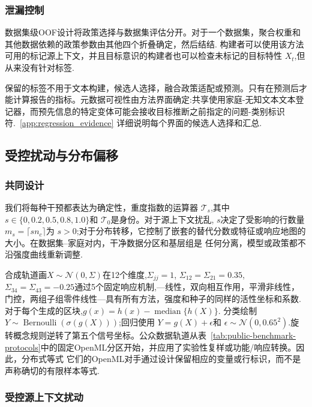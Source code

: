 \subsubsection{泄漏控制}
\label{app:leakage_control}

数据集级OOF设计将政策选择与数据集评估分开。对于一个数据集，聚合权重和其他数据依赖的政策参数由其他四个折叠确定，然后结结.
构建者可以使用该方法可用的标记源上下文，并且目标意识的构建者也可以检查未标记的目标特性 $X_t$,但从来没有针对标签.

保留的标签不用于文本构建，候选人选择，融合政策适配或预测。只有在预测后才能计算报告的指标。元数据可视性由方法界面确定:共享使用家庭-无知文本文本登记器，而预先信息的特定变体可能会接收目标推断之前指定的问题-类别标识符.~\ref{app:regression_evidence}
详细说明每个界面的候选人选择和汇总.

\subsection{受控扰动与分布偏移}
\label{app:data_transformations}

\subsubsection{共同设计}

我们将每种干预都表达为确定性，重度指数的运算器 $\mathcal T_s$,其中 $s\in\{0,0.2,0.5,0.8,1.0\}$和 $\mathcal T_0$是身份。对于源上下文扰乱, $s$决定了受影响的行数量 $m_s=\lceil s n_c\rceil$为 $s>0$;对于分布转移，它控制了嵌套的替代分数或特征或响应地图的大小。在数据集--家庭对内，干净数据分区和基层组是
任何分离，模型或政策都不沿强度曲线重新调整.

合成轨道画$X\sim\mathcal N(0,\Sigma)$在12个维度,$\Sigma_{jj}=1$, $\Sigma_{12}=\Sigma_{21}=0.35$,
$\Sigma_{34}=\Sigma_{43}=-0.25$通过5个固定响应机制,---线性，双向相互作用，平滑非线性，门控，两组子组零件线性---具有所有方法，强度和种子的同样的活性坐标和系数.
对于每个生成的区块,$g(x)=h(x)-\operatorname{median}\{h(X)\}$. 分类绘制 $Y\sim\operatorname{Bernoulli}(\sigma(g(X)))$;回归使用 $Y=g(X)+\epsilon$和 $\epsilon\sim\mathcal N(0,0.65^2)$.旋转概念规则逆转了第五个信号坐标。公众数据轨道从表~\ref{tab:public-benchmark-protocols}中的固定OpenML分区开始，并应用了实验性复样或功能/响应转换。因此，分布式等式
它们的OpenML对手通过设计保留相应的变量或行标识，而不是声称确切的有限样本等式.

\subsubsection{受控源上下文扰动}

